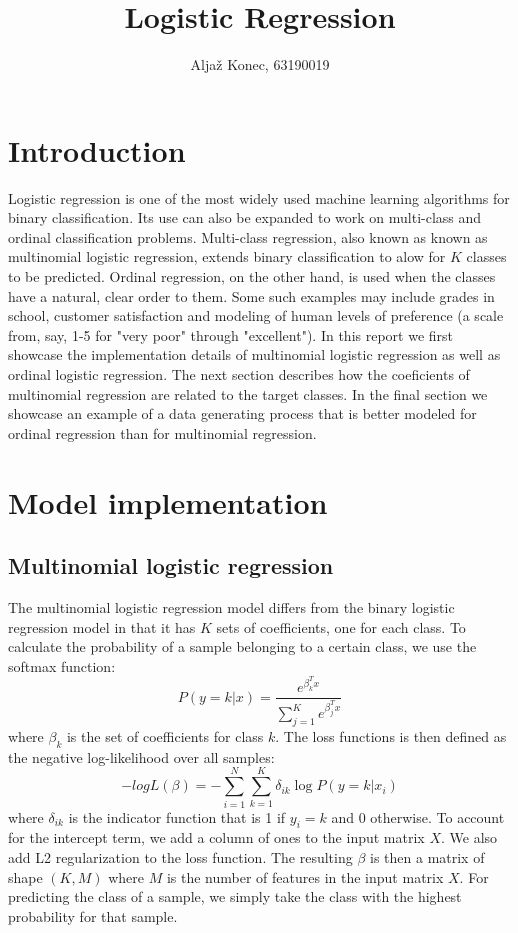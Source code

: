 \documentclass[9pt]{IEEEtran}
\title{\vspace{0ex}Logistic Regression}
\author{Aljaž Konec, 63190019\vspace{-4.0ex}}
\date{}
\begin{document}
\maketitle

\section{Introduction}

Logistic regression is one of the most widely used machine learning algorithms for binary classification.
Its use can also be expanded to work on multi-class and ordinal classification problems.
Multi-class regression, also known as known as multinomial logistic regression, extends binary classification to alow for $K$ classes to be predicted.
Ordinal regression, on the other hand, is used when the classes have a natural, clear order to them.
Some such examples may include grades in school, customer satisfaction and modeling of human levels of preference (a scale from, say, 1-5 for "very poor" through "excellent").
In this report we first showcase the implementation details of multinomial logistic regression as well as ordinal logistic regression.
The next section describes how the coeficients of multinomial regression are related to the target classes.
In the final section we showcase an example of a data generating process that is better modeled for ordinal regression than for multinomial regression.


\section{Model implementation}

\subsection*{Multinomial logistic regression}
The multinomial logistic regression model differs from the binary logistic regression model in that it has $K$ sets of coefficients, one for each class.
To calculate the probability of a sample belonging to a certain class, we use the softmax function:
\begin{equation}
    P(y = k | x) = \frac{e^{\beta_k^T x}}{\sum_{j=1}^{K} e^{\beta_j^T x}}
\end{equation}
where $\beta_k$ is the set of coefficients for class $k$.
The loss functions is then defined as the negative log-likelihood over all samples:
\begin{equation}
    -logL(\beta) = -\sum_{i=1}^{N} \sum_{k=1}^{K} \delta_{ik} \log P(y = k | x_i)
\end{equation}
where $\delta_{ik}$ is the indicator function that is 1 if $y_i = k$ and 0 otherwise.
To account for the intercept term, we add a column of ones to the input matrix $X$.
We also add L2 regularization to the loss function.
The resulting $\beta$ is then a matrix of shape $(K, M)$ where $M$ is the number of features in the input matrix $X$.
For predicting the class of a sample, we simply take the class with the highest probability for that sample.
\end{document}
